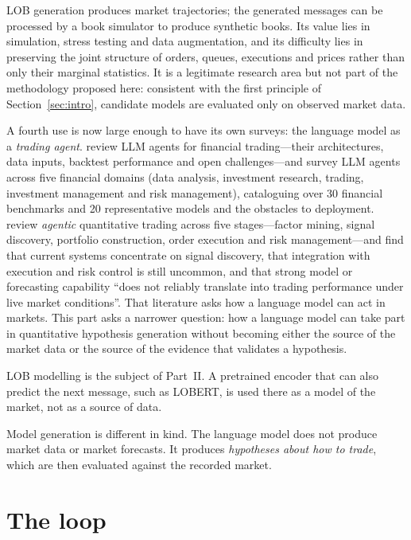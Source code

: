 LOB generation produces market trajectories; the generated messages can be processed by a book
simulator to produce synthetic books. Its value lies in simulation, stress testing and data
augmentation, and its difficulty lies in preserving the joint structure of orders, queues,
executions and prices rather than only their marginal statistics. It is a legitimate research area
but not part of the methodology proposed here: consistent with the first principle of
Section~\ref{sec:intro}, candidate models are evaluated only on observed market data.

A fourth use is now large enough to have its own surveys: the language model as a \emph{trading agent}.
\citet{ding2024llmtrading} review LLM agents for financial trading---their architectures, data inputs,
backtest performance and open challenges---and \citet{dong2025llmfinance} survey LLM agents across five
financial domains (data analysis, investment research, trading, investment management and risk
management), cataloguing over 30 financial benchmarks and 20 representative models and the obstacles to
deployment. \citet{hua2026agentic} review \emph{agentic} quantitative trading across five stages---factor
mining, signal discovery, portfolio construction, order execution and risk management---and find that
current systems concentrate on signal discovery, that integration with execution and risk control is
still uncommon, and that strong model or forecasting capability ``does not reliably translate into
trading performance under live market conditions''. That literature asks how a language model can act
in markets. This part asks a narrower
question: how a language model can take part in quantitative hypothesis generation without becoming
either the source of the market data or the source of the evidence that validates a hypothesis.

LOB modelling is the subject of Part~II. A pretrained encoder that can also predict the next
message, such as LOBERT, is used there as a model of the market, not as a source of data.

Model generation is different in kind. The language model does not produce market data or market
forecasts. It produces \emph{hypotheses about how to trade}, which are then evaluated against the
recorded market.

\section{The \lamd{} loop}
\label{sec:lamd}

